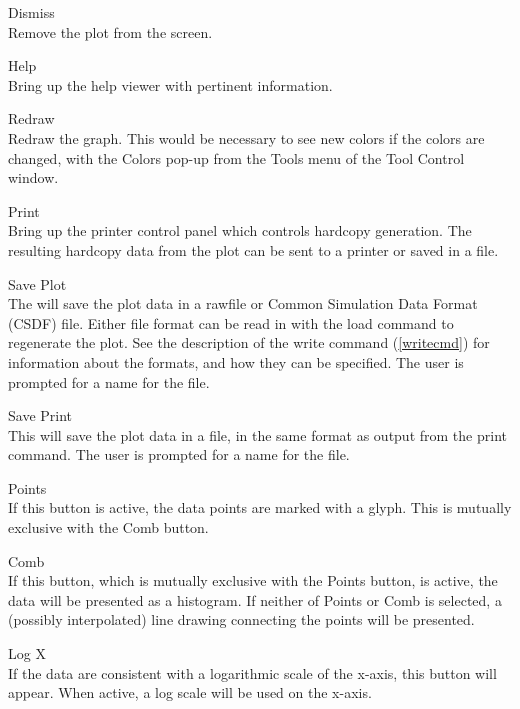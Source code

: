 \begin{description}
\item{\cb Dismiss}\\
Remove the plot from the screen.

\item{\cb Help}\\
Bring up the help viewer with pertinent information.

\item{\cb Redraw}\\
Redraw the graph.  This would be necessary to see new colors if the
colors are changed, with the {\cb Colors} pop-up from the {\cb Tools}
menu of the {\cb Tool Control} window. 

\item{\cb Print}\\
Bring up the printer control panel which controls hardcopy
generation.  The resulting hardcopy data from the plot can be sent to
a printer or saved in a file.

\item{\cb Save Plot}\\
The will save the plot data in a rawfile or Common Simulation Data
Format (CSDF) file.  Either file format can be read in with the {\cb
load} command to regenerate the plot.  See the description of the {\cb
write} command (\ref{writecmd}) for information about the formats, and
how they can be specified.  The user is prompted for a name for the
file.

\item{\cb Save Print}\\
This will save the plot data in a file, in the same format as output
from the {\cb print} command.  The user is prompted for a name for the
file.

\item{\cb Points}\\
If this button is active, the data points are marked with a glyph. 
This is mutually exclusive with the {\cb Comb} button.

\item{\cb Comb}\\
If this button, which is mutually exclusive with the {\cb Points}
button, is active, the data will be presented as a histogram.  If
neither of {\cb Points} or {\cb Comb} is selected, a (possibly
interpolated) line drawing connecting the points will be presented.

\item{\cb Log X}\\
If the data are consistent with a logarithmic scale of the x-axis,
this button will appear.  When active, a log scale will be used on the
x-axis.


\end{description}

